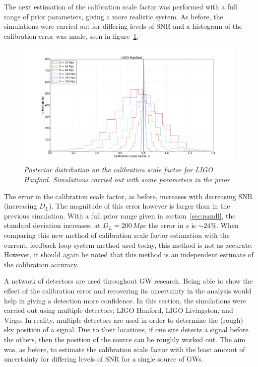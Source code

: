 \documentclass[12pt]{iopart}
\begin{document}
The next estimation of the calibration scale factor was performed with a full
range of prior parameters, giving a more realistic system. As before, the
simulations were carried out for differing levels of SNR and a histogram of the
calibration error was made, seen in figure~\ref{fig:sd-non-empty-D}.

\begin{figure}
  \centering
  \includegraphics[width = \textwidth]{SD_non_empty_D10_200}
  \caption{\textit{Posterior distribution on the calibration scale factor for
LIGO Hanford. Simulations carried out with some parameters in the prior.}}
  \label{fig:sd-non-empty-D}
\end{figure}

The error in the calibration scale factor, as before, increases with decreasing
SNR (increasing $D_{L}$). The magnitude of this error however is larger than in
the previous simulation. With a full prior range given in
section~\ref{sec:pandl}, the standard deviation increases; at $D_{L} =
200\,Mpc$ the error in $s$ is $\sim 24\%$. When comparing this new method of
calibration scale factor estimation with the current, feedback loop system
method used today, this method is not as accurate. However, it should again be
noted that this method is an independent estimate of the calibration accuracy.

A network of detectors are used throughout GW research. Being able to show the
effect of the calibration error and recovering its uncertainty in the analysis
would help in giving a detection more confidence. In this section, the
simulations were carried out using multiple detectors; LIGO Hanford, LIGO
Livingston, and Virgo. In reality, multiple detectors are used in order to
determine the (rough) sky position of a signal. Due to their locations, if one
site detects a signal before the others, then the position of the source can be
roughly worked out. The aim was, as before, to estimate the calibration scale
factor with the least amount of uncertainty for differing levels of SNR for a
single source of GWs.
\end{document}
